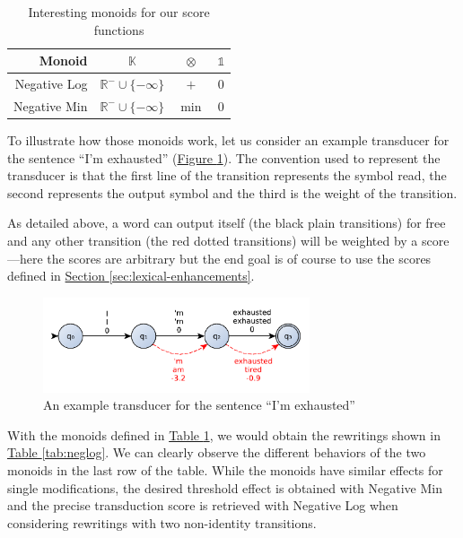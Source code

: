 \documentclass[a4paper, 11pt, onepage]{scrreprt}
\newcommand\tableref[1]{\hyperref[#1]{Table \ref*{#1}}}
\newcommand\figureref[1]{\hyperref[#1]{Figure \ref*{#1}}}
\newcommand\sectionref[1]{\hyperref[#1]{Section \ref*{#1}}}
\begin{document}
\begin{table}[H]
  \centering
  \caption{Interesting monoids for our score functions}
  \begin{tabular}{rccc}
    \toprule
    Monoid & $\mathbb{K}$ & $\otimes$ & $\mathbb{1}$ \\
    \midrule
    Negative Log & $\mathbb{R}^{-} \cup \{-\infty\}$ & $+$ & $0$ \\
    Negative Min & $\mathbb{R}^{-} \cup \{-\infty\}$ & $\min$ & $0$ \\
  \end{tabular}
  \label{tab:monoids}
\end{table}

To illustrate how those monoids work, let us consider an example
transducer for the sentence “I'm exhausted”
(\figureref{fig:transducer-ex}). The convention used to represent the
transducer is that the first line of the transition represents the
symbol read, the second represents the output symbol and the third is
the weight of the transition.

As detailed above, a word can output itself (the black plain
transitions) for free and any other transition (the red dotted
transitions) will be weighted by a score—here the scores are arbitrary
but the end goal is of course to use the scores defined
in \sectionref{sec:lexical-enhancements}.

\begin{figure}[H]
  \centering
  \includegraphics[width=0.7\textwidth]{semirings}
  \caption{An example transducer for the sentence “I'm exhausted”}
  \label{fig:transducer-ex}
\end{figure}

With the monoids defined in \tableref{tab:monoids}, we would obtain
the rewritings shown in \tableref{tab:neglog}. We can clearly observe
the different behaviors of the two monoids in the last row of the
table. While the monoids have similar effects for single
modifications, the desired threshold effect is obtained with Negative
Min and the precise transduction score is retrieved with Negative
Log when considering rewritings with two non-identity transitions.
\end{document}
